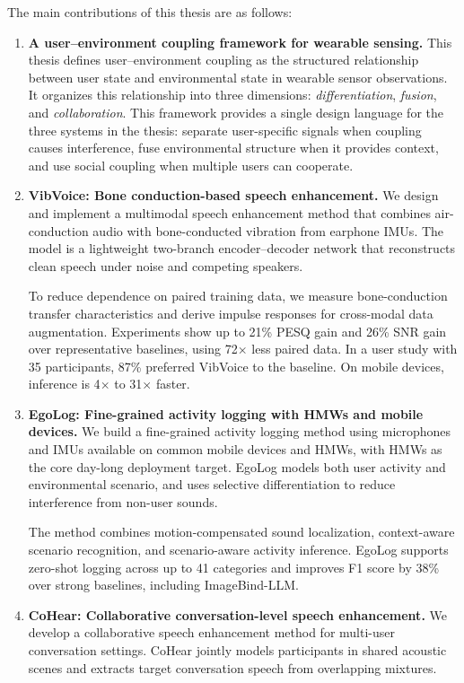 The main contributions of this thesis are as follows:
\begin{enumerate}
    \item \textbf{A user--environment coupling framework for wearable sensing.} This thesis defines user--environment coupling as the structured relationship between user state and environmental state in wearable sensor observations. It organizes this relationship into three dimensions: \textit{differentiation}, \textit{fusion}, and \textit{collaboration}. This framework provides a single design language for the three systems in the thesis: separate user-specific signals when coupling causes interference, fuse environmental structure when it provides context, and use social coupling when multiple users can cooperate.

    \item \textbf{VibVoice: Bone conduction-based speech enhancement.} We design and implement a multimodal speech enhancement method that combines air-conduction audio with bone-conducted vibration from earphone IMUs. The model is a lightweight two-branch encoder--decoder network that reconstructs clean speech under noise and competing speakers.

    To reduce dependence on paired training data, we measure bone-conduction transfer characteristics and derive impulse responses for cross-modal data augmentation. Experiments show up to 21\% PESQ gain and 26\% SNR gain over representative baselines, using 72$\times$ less paired data. In a user study with 35 participants, 87\% preferred VibVoice to the baseline. On mobile devices, inference is 4$\times$ to 31$\times$ faster.

    \item \textbf{EgoLog: Fine-grained activity logging with HMWs and mobile devices.} We build a fine-grained activity logging method using microphones and IMUs available on common mobile devices and HMWs, with HMWs as the core day-long deployment target. EgoLog models both user activity and environmental scenario, and uses selective differentiation to reduce interference from non-user sounds.

    The method combines motion-compensated sound localization, context-aware scenario recognition, and scenario-aware activity inference. EgoLog supports zero-shot logging across up to 41 categories and improves F1 score by 38\% over strong baselines, including ImageBind-LLM.

    \item \textbf{CoHear: Collaborative conversation-level speech enhancement.} We develop a collaborative speech enhancement method for multi-user conversation settings. CoHear jointly models participants in shared acoustic scenes and extracts target conversation speech from overlapping mixtures.


\end{enumerate}

